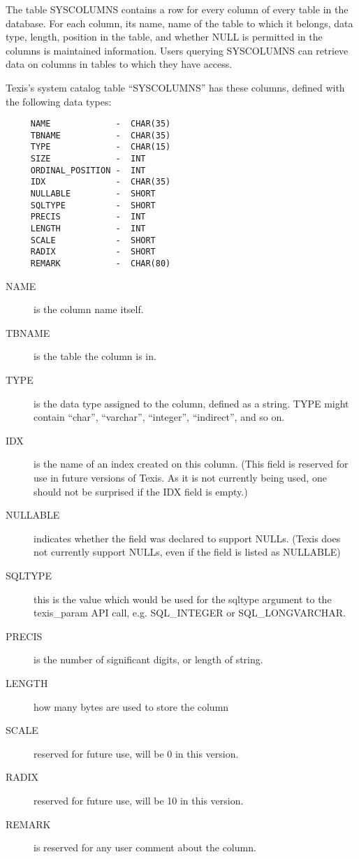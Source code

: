 The table SYSCOLUMNS contains a row for every column of every table
in the database.  For each column, its name, name of the table to
which it belongs, data type, length, position in the table, and
whether NULL is permitted in the columns is maintained information.
Users querying SYSCOLUMNS can retrieve data on columns in tables to
which they have access.

Texis's system catalog table ``SYSCOLUMNS'' has these columns, defined
with the following data types:

\begin{verbatim}
     NAME             -  CHAR(35)
     TBNAME           -  CHAR(35)
     TYPE             -  CHAR(15)
     SIZE             -  INT
     ORDINAL_POSITION -  INT
     IDX              -  CHAR(35)
     NULLABLE         -  SHORT
     SQLTYPE          -  SHORT
     PRECIS           -  INT
     LENGTH           -  INT
     SCALE            -  SHORT
     RADIX            -  SHORT
     REMARK           -  CHAR(80)
\end{verbatim}

\begin{description}
\item[NAME] is the column name itself.

\item[TBNAME] is the table the column is in.

\item[TYPE] is the data type assigned to the column, defined as a
string.  TYPE might contain ``char'', ``varchar'', ``integer'',
``indirect'', and so on.

\item[IDX] is the name of an index created on this column.  (This
field is reserved for use in future versions of Texis.  As it is not
currently being used, one should not be surprised if the IDX field
is empty.)

\item[NULLABLE] indicates whether the field was declared to support NULLs.
(Texis does not currently support NULLs, even if the field is listed as
NULLABLE)

\item[SQLTYPE] this is the value which would be used for the sqltype
argument to the texis_param API call, e.g. SQL_INTEGER or SQL_LONGVARCHAR.

\item[PRECIS] is the number of significant digits, or length of string.

\item[LENGTH] how many bytes are used to store the column

\item[SCALE] reserved for future use, will be 0 in this version.

\item[RADIX] reserved for future use, will be 10 in this version.

\item[REMARK] is reserved for any user comment about the column.
\end{description}

